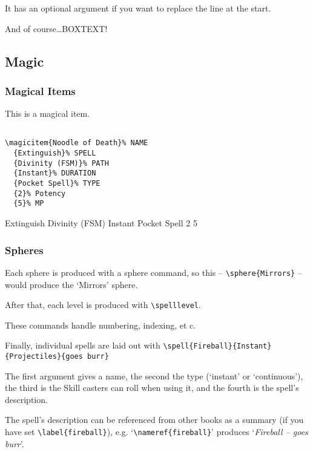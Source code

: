 \documentclass[a4paper,openany]{book}
\begin{document}
\begin{multicols}{2}
\begin{exampletext}
  It has an optional argument if you want to replace the line at the start.

\end{exampletext}

\begin{boxtext}
  And of course\ldots BOXTEXT!

\end{boxtext}

\subsection{Magic}

\subsubsection{Magical Items}

This is a magical item.

\begin{verbatim}

\magicitem{Noodle of Death}% NAME
  {Extinguish}% SPELL
  {Divinity (FSM)}% PATH
  {Instant}% DURATION
  {Pocket Spell}% TYPE
  {2}% Potency
  {5}% MP

\end{verbatim}

  {Extinguish}%
  {Divinity (FSM)}%
  {Instant}%
  {Pocket Spell}%
  {2}%
  {5}%

\subsubsection{Spheres}

Each sphere is produced with a sphere command, so this -- \verb"\sphere{Mirrors}" -- would produce the `Mirrors' sphere.

After that, each level is produced with \verb"\spelllevel".

These commands handle numbering, indexing, et c.

Finally, individual spells are laid out with \verb"\spell{Fireball}{Instant}{Projectiles}{goes burr}"

The first argument gives a name, the second the type (`instant' or `continuous'), the third is the Skill casters can roll when using it, and the fourth is the spell's description.

The spell's description can be referenced from other books as a summary (if you have set \verb"\label{fireball}"), e.g. `\verb"\nameref{fireball}"' produces `\textit{Fireball -- goes burr}'.


\end{multicols}
\end{document}
